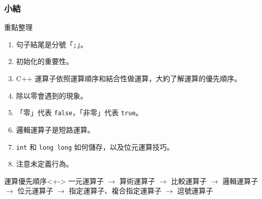 \documentclass[utf8]{beamer}
\begin{document}
\begin{CJK}{UTF8}{bkai}
\begin{frame}[fragile]
  \frametitle{小結}
  \begin{alertblock}{重點整理}
    \begin{enumerate}[<+->]
    \item 句子結尾是分號「\lstinline{;}{}」。
    \item 初始化的重要性。
    \item C++ 運算子依照運算順序和結合性做運算，大約了解運算的優先順序。
    \item 除以零會遇到的現象。
    \item 「零」代表 \lstinline{false}{}，「非零」代表 \lstinline{true}{}。
    \item 邏輯運算子是短路運算。
    \item \lstinline{int}{} 和 \lstinline{long long}{} 如何儲存，以及位元運算技巧。
    \item 注意未定義行為。
    \end{enumerate}
  \end{alertblock}
  \begin{exampleblock}{運算優先順序}<+->
  一元運算子 $\rightarrow$ 算術運算子 $\rightarrow$ 比較運算子 $\rightarrow$ 邏輯運算子 $\rightarrow$ 位元運算子 $\rightarrow$ 指定運算子、複合指定運算子 $\rightarrow$ 逗號運算子
  \end{exampleblock}
\end{frame}

\clearpage
\end{CJK}
\end{document}
